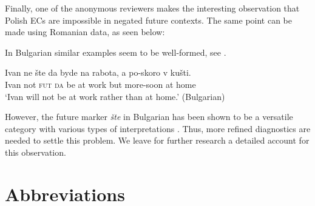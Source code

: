 \documentclass[output=paper,
]{langscibook}
\begin{document}
\noindent Finally, one of the anonymous reviewers makes the interesting observation that Polish ECs are impossible in negated future contexts. The same point can be made using Romanian data, as seen below:

	\z

\noindent In Bulgarian similar examples seem to be well-formed, see . 

\ea \gll Ivan ne šte da byde na rabota, a po-skoro v kušti.\\
    Ivan not \textsc{fut} \textsc{da} be at work but more-soon at home\\
    \glt `Ivan will not be at work rather than at home.'  \hfill (Bulgarian) \label{bulgfut}
    \z 
    

\noindent However, the future marker \textit{šte} in Bulgarian has been shown to be a versatile category with various types of interpretations \citep{rivsimeo14}. Thus, more refined diagnostics are needed to settle this problem. We leave for further research a detailed account for this observation. 



\nopagebreak
\section*{Abbreviations}
\end{document}
